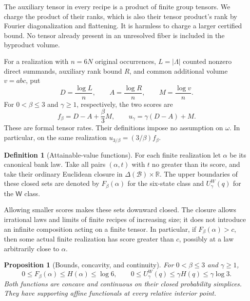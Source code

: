 \documentclass[11pt]{article}
\numberwithin{equation}{section}
\newtheorem{proposition}[theorem]{Proposition}
\theoremstyle{definition}
\newtheorem{definition}[theorem]{Definition}
\theoremstyle{remark}
\newcommand{\R}{\mathbb R}
\begin{document}
The auxiliary tensor in every recipe is a product of finite group tensors.
We charge the product of their ranks, which is also their tensor product's
rank by Fourier diagonalization and flattening.  It is harmless to charge a
larger certified bound.  No tensor already present in an unresolved fiber is
included in the byproduct volume.

For a realization with $n=6N$ original occurrences, $L=|\Lambda|$ counted
nonzero direct summands, auxiliary rank bound $R$, and common additional
volume $v=abc$, put
\begin{equation}
 D=\frac{\log L}{n},\qquad
 A=\frac{\log R}{n},\qquad
 M=\frac{\log v}{n}.
\label{val:rates}
\end{equation}
For $0<\beta\le3$ and $\gamma\ge1$, respectively, the two scores are
\begin{equation}
 f_\beta=D-A+\frac\beta3M,
 \qquad
 u_\gamma=\gamma(D-A)+M.
\label{val:scores}
\end{equation}
These are formal tensor rates.  Their definitions impose no assumption on
$\omega$.  In particular, on the same realization
$u_{3/\beta}=(3/\beta)f_\beta$.

\begin{definition}[Attainable-value functions]
\label{val:def-value}
For each finite realization let $\alpha$ be its canonical bank law.  Take all
pairs $(\alpha,t)$ with $t$ no greater than its score, and take their ordinary
Euclidean closure in $\Delta(\mathcal B)\times\R$.  The upper boundaries of
these closed sets are denoted by $F_\beta(\alpha)$ for the six-state class
and $U^W_\gamma(q)$ for the $\mathsf W$ class.
\end{definition}

Allowing smaller scores makes these sets downward closed.  The closure allows
irrational laws and limits of finite recipes of increasing size; it does not
introduce an infinite composition acting on a finite tensor.  In particular,
if $F_\beta(\alpha)>c$, then some actual finite realization has score greater
than $c$, possibly at a law arbitrarily close to $\alpha$.

\begin{proposition}[Bounds, concavity, and continuity]
\label{prop:values}
For $0<\beta\le3$ and $\gamma\ge1$,
\begin{equation}
 0\le F_\beta(\alpha)\le H(\alpha)\le\log6,
 \qquad
 0\le U^W_\gamma(q)\le\gamma H(q)\le\gamma\log3.
\label{val:entropy-cap}
\end{equation}
Both functions are concave and continuous on their closed probability
simplices.  They have supporting affine functionals at every relative
interior point.
\end{proposition}
\end{document}
